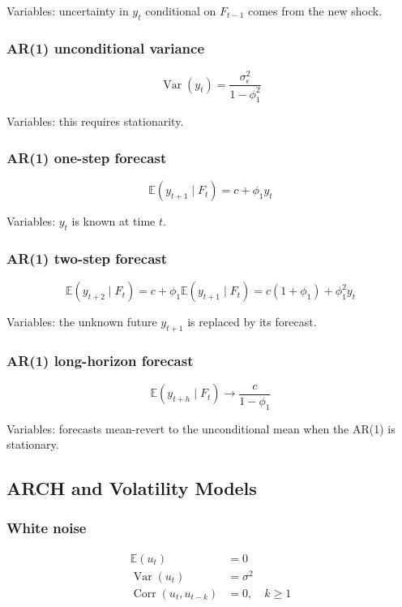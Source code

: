 \documentclass[
  8pt,
  twocolumn]{extarticle}
\begin{document}
Variables: uncertainty in \(y_t\) conditional on \(F_{t-1}\) comes from
the new shock.

\subsubsection{AR(1) unconditional
variance}\label{ar1-unconditional-variance}

\[
\operatorname{Var}(y_t)=\frac{\sigma_\epsilon^2}{1-\phi_1^2}
\]

Variables: this requires stationarity.

\subsubsection{AR(1) one-step forecast}\label{ar1-one-step-forecast}

\[
\mathbb E(y_{t+1}\mid F_t)=c+\phi_1y_t
\]

Variables: \(y_t\) is known at time \(t\).

\subsubsection{AR(1) two-step forecast}\label{ar1-two-step-forecast}

\[
\mathbb E(y_{t+2}\mid F_t)=c+\phi_1\mathbb E(y_{t+1}\mid F_t)=c(1+\phi_1)+\phi_1^2y_t
\]

Variables: the unknown future \(y_{t+1}\) is replaced by its forecast.

\subsubsection{AR(1) long-horizon
forecast}\label{ar1-long-horizon-forecast}

\[
\mathbb E(y_{t+h}\mid F_t)\to \frac{c}{1-\phi_1}
\]

Variables: forecasts mean-revert to the unconditional mean when the
AR(1) is stationary.

\subsection{ARCH and Volatility
Models}\label{arch-and-volatility-models}

\subsubsection{White noise}\label{white-noise}

\[
\begin{aligned}
\mathbb E(u_t)&=0\\
\operatorname{Var}(u_t)&=\sigma^2\\
\operatorname{Corr}(u_t,u_{t-k})&=0,\quad k\ge1
\end{aligned}
\]
\end{document}
